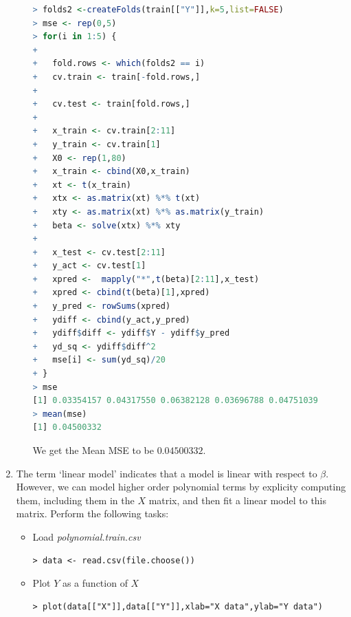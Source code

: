 \documentclass[fontsize=10pt,DIV=14]{scrartcl}
\begin{document}
\begin{enumerate}
\begin{itemize}
			\begin{lstlisting}[language=R,frame=single]
> folds2 <-createFolds(train[["Y"]],k=5,list=FALSE)
> mse <- rep(0,5)
> for(i in 1:5) {  
+  
+   fold.rows <- which(folds2 == i)
+   cv.train <- train[-fold.rows,]
+   
+   cv.test <- train[fold.rows,]
+   
+   x_train <- cv.train[2:11]
+   y_train <- cv.train[1]
+   X0 <- rep(1,80)
+   x_train <- cbind(X0,x_train)
+   xt <- t(x_train)
+   xtx <- as.matrix(xt) %*% t(xt)
+   xty <- as.matrix(xt) %*% as.matrix(y_train)
+   beta <- solve(xtx) %*% xty
+   
+   x_test <- cv.test[2:11]
+   y_act <- cv.test[1]
+   xpred <-  mapply("*",t(beta)[2:11],x_test)
+   xpred <- cbind(t(beta)[1],xpred)
+   y_pred <- rowSums(xpred)
+   ydiff <- cbind(y_act,y_pred)
+   ydiff$diff <- ydiff$Y - ydiff$y_pred
+   yd_sq <- ydiff$diff^2
+   mse[i] <- sum(yd_sq)/20
+ }
> mse
[1] 0.03354157 0.04317550 0.06382128 0.03696788 0.04751039
> mean(mse)
[1] 0.04500332
			\end{lstlisting}

			We get the Mean MSE to be $0.04500332$.
		\end{itemize}

		\item
		The term `linear model' indicates that a model is linear with respect to $\beta$. However, we can model higher order polynomial terms by explicity computing them, including them in the $X$ matrix, and then ﬁt a linear model to this matrix. Perform the following tasks:

		\begin{itemize}
			\item
			Load \emph{polynomial.train.csv}
			\begin{verbatim}
> data <- read.csv(file.choose())
			\end{verbatim}

			\item
			Plot $Y$ as a function of $X$
\begin{verbatim}
> plot(data[["X"]],data[["Y"]],xlab="X data",ylab="Y data")
\end{verbatim}
			

\end{itemize}
\end{enumerate}
\end{document}
